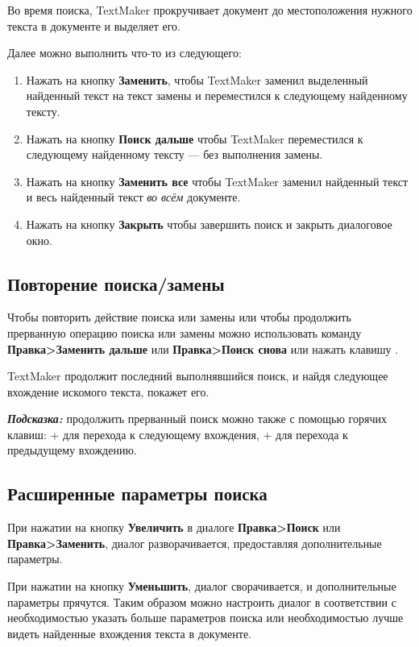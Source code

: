 \documentclass[a4paper,10pt]{article}
\begin{document}
Во время поиска, TextMaker прокручивает документ до местоположения нужного текста в документе и выделяет его.

Далее можно выполнить что-то из следующего:

\begin{enumerate}[label=\Alph*]
 \item Нажать на кнопку \textbf{Заменить}, чтобы TextMaker заменил выделенный найденный текст на текст замены и переместился к следующему найденному тексту.
 \item Нажать на кнопку \textbf{Поиск дальше} чтобы TextMaker переместился к следующему найденному тексту --- без выполнения замены.
 \item Нажать на кнопку \textbf{Заменить все} чтобы TextMaker заменил найденный текст и весь найденный текст \textit{во всём} документе.
 \item Нажать на кнопку \textbf{Закрыть} чтобы завершить поиск и закрыть диалоговое окно.
\end{enumerate}

\subsection{Повторение поиска/замены}
Чтобы повторить действие поиска или замены или чтобы продолжить прерванную операцию поиска или замены можно использовать команду \textbf{Правка>Заменить дальше} или \textbf{Правка>Поиск снова} или нажать клавишу .

TextMaker продолжит последний выполнявшийся поиск, и найдя следующее вхождение искомого текста, покажет его.

\begin{mdframed}[backgroundcolor=blue!10]
\textbf{\textit{Подсказка:}} продолжить прерванный поиск можно также с помощью горячих клавиш: + для перехода к следующему вхождения, + для перехода к предыдущему вхождению.
\end{mdframed}

\subsection{Расширенные параметры поиска}
При нажатии на кнопку \textbf{Увеличить} в диалоге \textbf{Правка>Поиск} или \textbf{Правка>Заменить}, диалог разворачивается, предоставляя дополнительные параметры.

При нажатии на кнопку \textbf{Уменьшить}, диалог сворачивается, и дополнительные параметры прячутся. Таким образом можно настроить диалог в соответствии с необходимостью указать больше параметров поиска или необходимостью лучше видеть найденные вхождения текста в документе.
\end{document}
